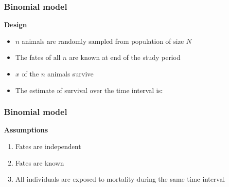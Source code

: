 \documentclass[color=usenames,dvipsnames]{beamer}\usepackage[]{graphicx}\usepackage[]{color}
\begin{document}
\begin{frame}
  \frametitle{Binomial model}
  {\bf Design}
  \begin{itemize}%
    \item<1-> $n$ animals are randomly sampled from population of size $N$
    \item<2-> The fates of all $n$ are known at end of the study period
    \item<3-> $x$ of the $n$ animals survive
    \item<4-> The estimate of survival over the time interval is:
  \end{itemize}
  \pause
  \Large
  \vspace{0.5cm}
\end{frame}



\begin{frame}
  \frametitle{Binomial model}
  \large
  {\bf Assumptions}
  \begin{enumerate}[\bf (1)] %
    \item<1-> Fates are independent
    \item<1-> Fates are known
    \item<1-> All individuals are exposed to mortality during the same time interval
  \end{enumerate}
  \vspace{0.5cm}
  \bf
  \vspace{0.5cm}
\end{frame}
\end{document}
